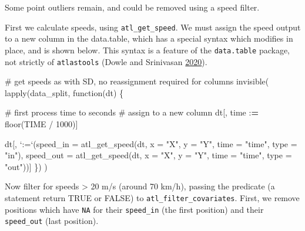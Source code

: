 \documentclass[]{scrreprt}
\newenvironment{Shaded}{}{}
\newcommand{\CommentTok}[1]{\textcolor[rgb]{0.00,0.50,0.00}{#1}}
\newcommand{\ControlFlowTok}[1]{\textcolor[rgb]{0.00,0.00,1.00}{#1}}
\newcommand{\DataTypeTok}[1]{#1}
\newcommand{\DecValTok}[1]{#1}
\newcommand{\ErrorTok}[1]{\textcolor[rgb]{1.00,0.00,0.00}{\textbf{#1}}}
\newcommand{\KeywordTok}[1]{\textcolor[rgb]{0.00,0.00,1.00}{#1}}
\newcommand{\NormalTok}[1]{#1}
\newcommand{\OperatorTok}[1]{#1}
\newcommand{\StringTok}[1]{\textcolor[rgb]{0.00,0.50,0.50}{#1}}
\begin{document}
Some point outliers remain, and could be removed using a speed filter.

First we calculate speeds, using \texttt{atl\_get\_speed}. We must assign the speed output to a new column in the data.table, which has a special syntax which modifies in place, and is shown below. This syntax is a feature of the \texttt{data.table} package, not strictly of \texttt{atlastools} (Dowle and Srinivasan \protect\hyperlink{ref-dowle2020}{2020}).

\begin{Shaded}
\begin{Highlighting}[]
\CommentTok{# get speeds as with SD, no reassignment required for columns}
\KeywordTok{invisible}\NormalTok{(}
  \KeywordTok{lapply}\NormalTok{(data_split, }\ControlFlowTok{function}\NormalTok{(dt) \{}
    
    \CommentTok{# first process time to seconds}
    \CommentTok{# assign to a new column}
\NormalTok{    dt[, time }\OperatorTok{:}\ErrorTok{=}\StringTok{ }\KeywordTok{floor}\NormalTok{(TIME }\OperatorTok{/}\StringTok{ }\DecValTok{1000}\NormalTok{)]}
    
\NormalTok{    dt[, }\StringTok{`}\DataTypeTok{:=}\StringTok{`}\NormalTok{(}\DataTypeTok{speed_in =} \KeywordTok{atl_get_speed}\NormalTok{(dt, }
                                       \DataTypeTok{x =} \StringTok{"X"}\NormalTok{, }\DataTypeTok{y =} \StringTok{"Y"}\NormalTok{, }
                                       \DataTypeTok{time =} \StringTok{"time"}\NormalTok{,}
                                       \DataTypeTok{type =} \StringTok{"in"}\NormalTok{),}
              \DataTypeTok{speed_out =} \KeywordTok{atl_get_speed}\NormalTok{(dt, }
                                       \DataTypeTok{x =} \StringTok{"X"}\NormalTok{, }\DataTypeTok{y =} \StringTok{"Y"}\NormalTok{, }
                                       \DataTypeTok{time =} \StringTok{"time"}\NormalTok{,}
                                       \DataTypeTok{type =} \StringTok{"out"}\NormalTok{))]}
\NormalTok{  \})}
\NormalTok{)}
\end{Highlighting}
\end{Shaded}

Now filter for speeds \textgreater{} 20 m/s (around 70 km/h), passing the predicate (a statement return TRUE or FALSE) to \texttt{atl\_filter\_covariates}. First, we remove positions which have \texttt{NA} for their \texttt{speed\_in} (the first position) and their \texttt{speed\_out} (last position).
\end{document}

